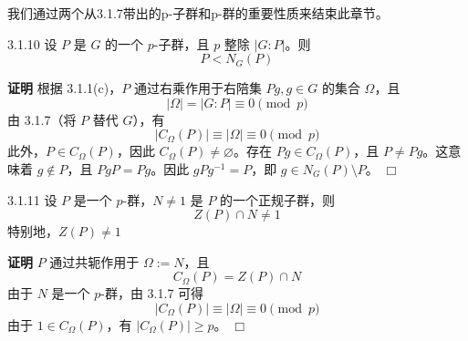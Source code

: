 \documentclass[UTF8]{ctexart}
\begin{document}
我们通过两个从3.1.7带出的p-子群和p-群的重要性质来结束此章节。

3.1.10
设 $P$ 是 $G$ 的一个 $p$-子群，且 $p$ 整除 $|G : P|$。则
$$
    P < N_G(P)
$$

\textbf{证明}
根据 3.1.1(c)，$P$ 通过右乘作用于右陪集 $Pg, g \in G$ 的集合 $\Omega$，且
$$
    |\Omega| = |G : P| \equiv 0 \pmod{p}
$$
由 3.1.7（将 $P$ 替代 $G$），有
$$
    |C_\Omega(P)| \equiv |\Omega| \equiv 0 \pmod{p}
$$
此外，$P \in C_\Omega(P)$，因此 $C_\Omega(P) \neq \varnothing$。存在 $Pg \in C_\Omega(P)$，且 $P \neq Pg$。这意味着 $g \notin P$，且 $PgP = Pg$。因此 $gPg^{-1} = P$，即 $g \in N_G(P) \setminus P$。 $\Box$


3.1.11
设 $P$ 是一个 $p$-群，$N \neq 1$ 是 $P$ 的一个正规子群，则
$$
    Z(P) \cap N \neq 1
$$
特别地，$Z(P) \neq 1$

\textbf{证明}
$P$ 通过共轭作用于 $\Omega := N$，且
$$
    C_\Omega(P) = Z(P) \cap N
$$
由于 $N$ 是一个 $p$-群，由 3.1.7 可得
$$
    |C_\Omega(P)| \equiv |\Omega| \equiv 0 \pmod{p}
$$
由于 $1 \in C_\Omega(P)$，有 $|C_\Omega(P)| \geq p$。 $\Box$







\end{document}

